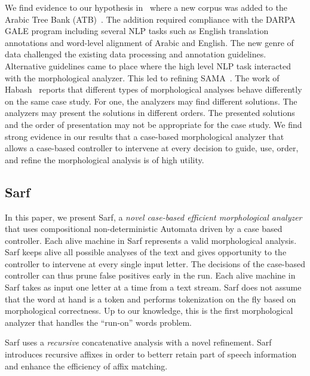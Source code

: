 \documentclass[11pt]{article}
\begin{document}
We find evidence to our hypothesis in~\cite{Maamouri:10} where 
a new corpus was added to the Arabic Tree Bank 
(ATB)~\cite{Maamouri:04}. 
The addition required compliance with the DARPA GALE program 
including several NLP tasks such as English translation 
annotations and word-level alignment of Arabic and English. 
The new genre of data challenged the existing data processing and 
annotation guidelines. 
Alternative guidelines came to place where the high level NLP 
task interacted with the morphological analyzer. 
This led to refining SAMA~\cite{Kulick:10}. 
The work of Habash~ reports that different 
types of morphological analyses behave differently on the same case 
study. 
For one, the analyzers may find different solutions. 
The analyzers may present the solutions in different orders. 
The presented solutions and the order of presentation may not be 
appropriate for the case study. 
We find strong evidence in our results 
that a case-based morphological analyzer that allows a case-based 
controller to intervene at every decision to guide, use, order, and 
refine the morphological analysis is of high utility.

\subsection{Sarf}
\label{sec:intro:sarf}

In this paper, we present Sarf, a {\em novel case-based efficient
morphological analyzer} that uses compositional 
non-deterministic Automata driven by a case based controller.
Each alive machine in Sarf represents a valid morphological analysis. 
Sarf keeps alive all possible analyses of the text and gives 
opportunity to the controller to intervene at every single input 
letter. 
The decisions of the case-based controller can thus prune false 
positives early in the run. 
Each alive machine in Sarf takes as input one letter at a time 
from a text stream. 
Sarf does not assume that the word at hand is a token and
performs tokenization on the fly based on morphological correctness.
Up to our knowledge, this is the first morphological analyzer that 
handles the ``run-on'' words problem. 

Sarf uses a {\em recursive} concatenative analysis with a novel 
refinement. 
Sarf introduces recursive affixes in order to
betterr retain part of speech information and enhance the 
efficiency of affix matching. 


\transfalse
\begin{figure}[tb]
\end{figure}
\transtrue
\end{document}
